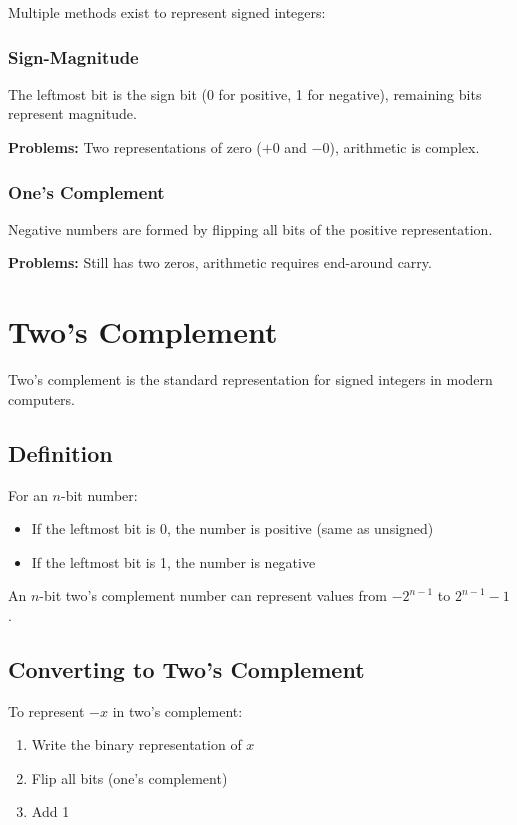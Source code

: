 \documentclass{report}
\begin{document}
Multiple methods exist to represent signed integers:

\subsubsection{Sign-Magnitude}

The leftmost bit is the sign bit (0 for positive, 1 for negative), remaining bits represent magnitude.

\textbf{Problems:} Two representations of zero ($+0$ and $-0$), arithmetic is complex.

\subsubsection{One's Complement}

Negative numbers are formed by flipping all bits of the positive representation.

\textbf{Problems:} Still has two zeros, arithmetic requires end-around carry.

\section{Two's Complement}

Two's complement is the standard representation for signed integers in modern computers.

\subsection{Definition}

For an $n$-bit number:
\begin{itemize}
    \item If the leftmost bit is 0, the number is positive (same as unsigned)
    \item If the leftmost bit is 1, the number is negative
\end{itemize}

An $n$-bit two's complement number can represent values from $-2^{n-1}$ to $2^{n-1} - 1$.

\subsection{Converting to Two's Complement}

To represent $-x$ in two's complement:
\begin{enumerate}
    \item Write the binary representation of $x$
    \item Flip all bits (one's complement)
    \item Add 1
\end{enumerate}
\end{document}
